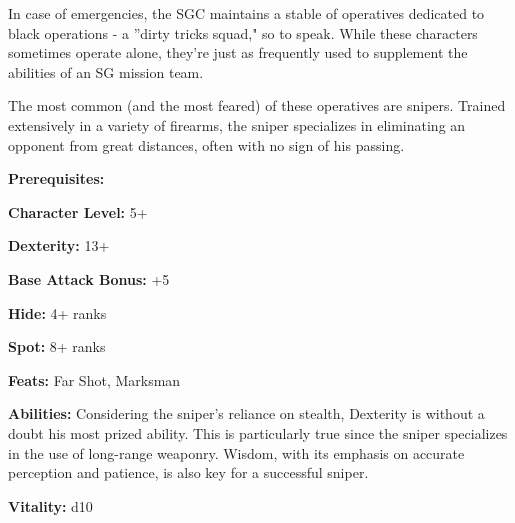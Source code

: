\begin{multicols}{2}

In case of emergencies, the SGC maintains a stable of operatives dedicated to black operations - a ''dirty tricks squad," so to speak. While these characters sometimes operate alone, they're just as frequently used to supplement the abilities of an SG mission team.

The most common (and the most feared)  of these operatives are snipers. Trained extensively in a variety of firearms, the sniper specializes in eliminating an opponent from great distances, often with no sign of his passing.

\columnbreak

\textbf{Prerequisites:} 
\begin{description*}
\item[\hspace{1.5cm}\textbf{Character Level:}] 5+
\item[\hspace{1.5cm}\textbf{Dexterity:}] 13+
\item[\hspace{1.5cm}\textbf{Base Attack Bonus:}] +5
\item[\hspace{1.5cm}\textbf{Hide:}] 4+ ranks
\item[\hspace{1.5cm}\textbf{Spot:}] 8+ ranks
\item[\hspace{1.5cm}\textbf{Feats:}] Far Shot, Marksman
\end{description*}

\textbf{Abilities:} Considering the sniper's reliance on stealth, Dexterity is without a doubt his most prized ability. This is particularly true since the sniper specializes in the use of long-range weaponry. Wisdom, with its emphasis on accurate perception and patience, is also key for a successful sniper.

\textbf{Vitality:} d10

\end{multicols}


